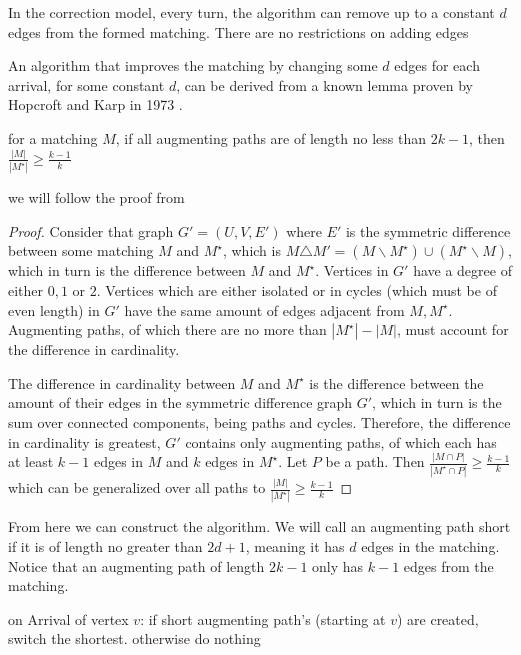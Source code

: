 \begin{definition}
	In the correction model, every turn, the algorithm can remove up to a constant $d$ edges from the formed matching. There are no restrictions on adding edges
\end{definition}
An algorithm that improves the matching by changing some $d$ edges for each arrival, for some constant $d$, can be derived from a known lemma proven by Hopcroft and Karp in 1973 \cite{hopcroft-karp}.
\begin{lemma}
	for a matching $M$, if all augmenting paths are of length no less than $2k-1$, then $\frac{|M|}{|M^\star|}\geq\frac{k-1}{k}$
\end{lemma}
we will follow the proof from \cite{correction}
\begin{proof}
	Consider that graph $G'=(U,V,E')$ where $E'$ is the symmetric difference between some matching $M$ and $M^\star$, which is $M\triangle M'=(M\backslash M^\star)\cup(M^\star\backslash M)$, which in turn is the difference between $M$ and $M^\star$. Vertices in $G'$ have a degree of either $0,1$ or $2$. Vertices which are either isolated or in cycles (which must be of even length) in $G'$ have the same amount of edges adjacent from $M,M^\star$. Augmenting paths, of which there are no more than $|M^\star|-|M|$, must account for the difference in cardinality.

	The difference in cardinality between $M$ and $M^\star$ is the difference between the amount of their edges in the symmetric difference graph $G'$, which in turn is the sum over connected components, being paths and cycles. Therefore, the difference in cardinality is greatest, $G'$ contains only augmenting paths, of which each has at least $k-1$ edges in $M$ and $k$ edges in $M^\star$. Let $P$ be a path. Then $\frac{|M\cap P|}{|M^\star\cap P|}\geq\frac{k-1}{k}$ which can be generalized over all paths to $\frac{|M|}{|M^\star|}\geq\frac{k-1}{k}$
\end{proof}
From here we can construct the algorithm. We will call an augmenting path short if it is of length no greater than $2d+1$, meaning it has $d$ edges in the matching. Notice that an augmenting path of length $2k-1$ only has $k-1$ edges from the matching.
\begin{algorithm}
	\caption{$d$-augmenting correction}
	\label{alg:correction}
	\begin{algorithmic}
		\item on Arrival of vertex $v$: if short augmenting path's (starting at $v$) are created, switch the shortest. otherwise do nothing
	\end{algorithmic}
\end{algorithm}

